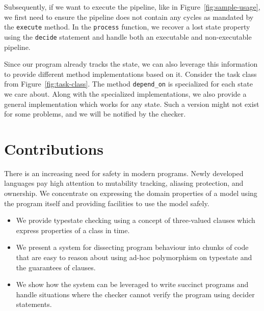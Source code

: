 \documentclass[sigconf,screen,nonacm]{acmart}
\begin{document}
Subsequently, if we want to execute the pipeline, like in Figure~\ref{fig:sample-usage}, we first need to ensure the pipeline does not contain any cycles as mandated by the \verb|execute| method. In the \verb|process| function, we recover a lost state property using the \verb|decide| statement and handle both an executable and non-executable pipeline.


Since our program already tracks the state, we can also leverage this information to provide different method implementations based on it. Consider the task class from Figure~\ref{fig:task-class}. The method \verb|depend_on| is specialized for each state we care about. Along with the specialized implementations, we also provide a general implementation which works for any state. Such a version might not exist for some problems, and we will be notified by the checker. 

\section{Contributions}
There is an increasing need for safety in modern programs. Newly developed languages pay high attention to mutability tracking, aliasing protection, and ownership. We concentrate on expressing the domain properties of a model using the program itself and providing facilities to use the model safely.

\begin{itemize}
    \item We provide typestate checking using a concept of three-valued clauses which express properties of a class in time.
    \item We present a system for dissecting program behaviour into chunks of code that are easy to reason about using ad-hoc polymorphism on typestate and the guarantees of clauses.
    \item We show how the system can be leveraged to write succinct programs and handle situations where the checker cannot verify the program using decider statements.
\end{itemize}
\end{document}
